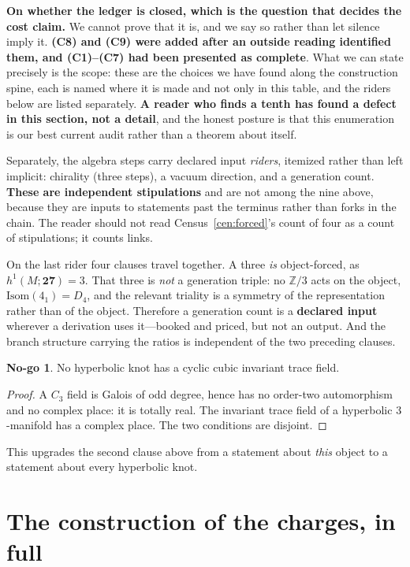 \documentclass[11pt,reqno]{amsart}
\theoremstyle{plain}
\theoremstyle{definition}
\newtheorem{nogo}[theorem]{No-go}
\theoremstyle{remark}
\newcommand{\Z}{\mathbb{Z}}
\begin{document}
\textbf{On whether the ledger is closed, which is the question that decides the cost
claim.} We cannot prove that it is, and we say so rather than let silence imply it.
\textbf{(C8) and (C9) were added after an outside reading identified them, and
(C1)--(C7) had been presented as complete}. What we can state precisely is the scope:
these are the choices we have found along the construction spine, each is named where it
is made and not only in this table, and the riders below are listed separately.
\textbf{A reader who finds a tenth has found a defect in this section, not a detail},
and the honest posture is that this enumeration is our best current audit rather than a
theorem about itself.

Separately, the algebra steps carry declared input \emph{riders}, itemized rather than
left implicit: chirality (three steps), a vacuum direction, and a generation count.
\textbf{These are independent stipulations} and are not among the nine above, because
they are inputs to statements past the terminus rather than forks in the chain. The
reader should not read Census~\ref{cen:forced}'s count of four as a count of
stipulations; it counts links.

On the last rider four clauses travel together. A three \emph{is} object-forced, as
$h^1(M;\mathbf{27})=3$. That three is \emph{not} a generation triple: no $\Z/3$ acts on
the object, $\mathrm{Isom}(4_1)=D_4$, and the relevant triality is a symmetry of the
representation rather than of the object. Therefore a generation count is a
\textbf{declared input} wherever a derivation uses it---booked and priced, but not an
output. And the branch structure carrying the ratios is independent of the two preceding
clauses.

\begin{nogo}\label{ng:c3}
No hyperbolic knot has a cyclic cubic invariant trace field.
\end{nogo}

\begin{proof}
A $C_3$ field is Galois of odd degree, hence has no order-two automorphism and no
complex place: it is totally real. The invariant trace field of a hyperbolic
$3$-manifold has a complex place. The two conditions are disjoint.
\end{proof}

This upgrades the second clause above from a statement about \emph{this} object to a
statement about every hyperbolic knot.

\appendix

\section{The construction of the charges, in full}\label{app:construct}
\end{document}
